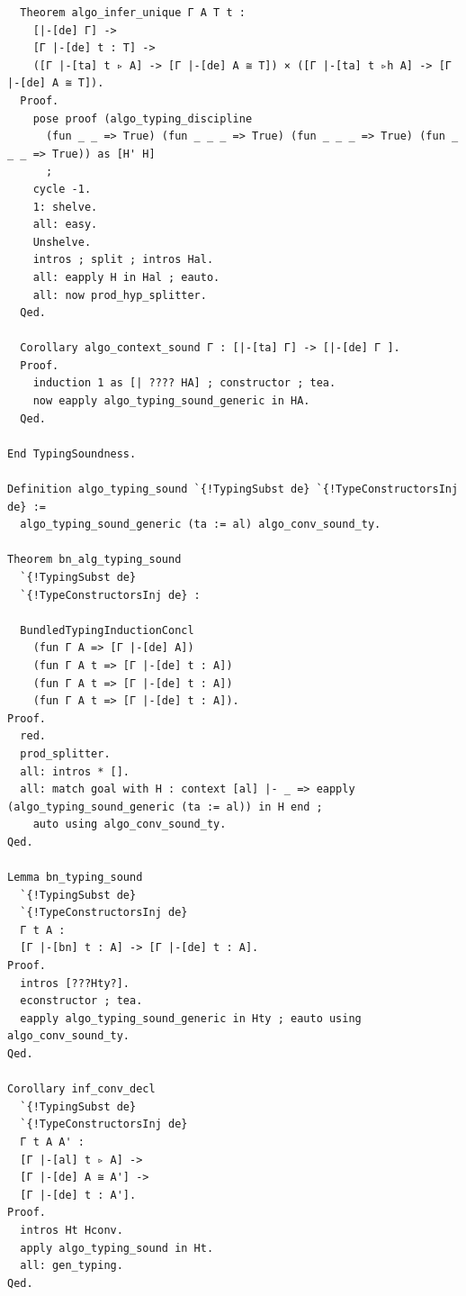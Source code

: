 \begin{lstlisting}
  Theorem algo_infer_unique Γ A T t :
    [|-[de] Γ] ->
    [Γ |-[de] t : T] ->
    ([Γ |-[ta] t ▹ A] -> [Γ |-[de] A ≅ T]) × ([Γ |-[ta] t ▹h A] -> [Γ |-[de] A ≅ T]).
  Proof.
    pose proof (algo_typing_discipline 
      (fun _ _ => True) (fun _ _ _ => True) (fun _ _ _ => True) (fun _ _ _ => True)) as [H' H] 
      ;
    cycle -1.
    1: shelve.
    all: easy.
    Unshelve.
    intros ; split ; intros Hal.
    all: eapply H in Hal ; eauto.
    all: now prod_hyp_splitter.
  Qed.

  Corollary algo_context_sound Γ : [|-[ta] Γ] -> [|-[de] Γ ].
  Proof.
    induction 1 as [| ???? HA] ; constructor ; tea.
    now eapply algo_typing_sound_generic in HA.
  Qed.

End TypingSoundness.

Definition algo_typing_sound `{!TypingSubst de} `{!TypeConstructorsInj de} :=
  algo_typing_sound_generic (ta := al) algo_conv_sound_ty.

Theorem bn_alg_typing_sound
  `{!TypingSubst de}
  `{!TypeConstructorsInj de} :

  BundledTypingInductionConcl
    (fun Γ A => [Γ |-[de] A])
    (fun Γ A t => [Γ |-[de] t : A])
    (fun Γ A t => [Γ |-[de] t : A])
    (fun Γ A t => [Γ |-[de] t : A]).
Proof.
  red.
  prod_splitter.
  all: intros * [].
  all: match goal with H : context [al] |- _ => eapply (algo_typing_sound_generic (ta := al)) in H end ;
    auto using algo_conv_sound_ty.
Qed.

Lemma bn_typing_sound 
  `{!TypingSubst de}
  `{!TypeConstructorsInj de}
  Γ t A :
  [Γ |-[bn] t : A] -> [Γ |-[de] t : A].
Proof.
  intros [???Hty?].
  econstructor ; tea.
  eapply algo_typing_sound_generic in Hty ; eauto using algo_conv_sound_ty.
Qed.

Corollary inf_conv_decl
  `{!TypingSubst de}
  `{!TypeConstructorsInj de}
  Γ t A A' :
  [Γ |-[al] t ▹ A] ->
  [Γ |-[de] A ≅ A'] ->
  [Γ |-[de] t : A'].
Proof.
  intros Ht Hconv.
  apply algo_typing_sound in Ht.
  all: gen_typing.
Qed.
\end{lstlisting}

